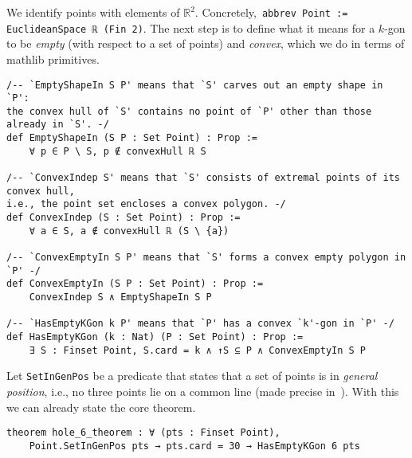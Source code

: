 We identify points with elements of $\mathbb{R}^2$. Concretely,~\lstinline|abbrev Point := EuclideanSpace ℝ (Fin 2)|.
The next step is to define what it means for a $k$-gon to be \emph{empty} (with respect to a set of points) and \emph{convex}, which we do in terms of \textsf{mathlib} primitives.

\begin{lstlisting}
/-- `EmptyShapeIn S P' means that `S' carves out an empty shape in `P':
the convex hull of `S' contains no point of `P' other than those already in `S'. -/
def EmptyShapeIn (S P : Set Point) : Prop :=
    ∀ p ∈ P \ S, p ∉ convexHull ℝ S

/-- `ConvexIndep S' means that `S' consists of extremal points of its convex hull,
i.e., the point set encloses a convex polygon. -/
def ConvexIndep (S : Set Point) : Prop :=
    ∀ a ∈ S, a ∉ convexHull ℝ (S \ {a})

/-- `ConvexEmptyIn S P' means that `S' forms a convex empty polygon in `P' -/
def ConvexEmptyIn (S P : Set Point) : Prop :=
    ConvexIndep S ∧ EmptyShapeIn S P

/-- `HasEmptyKGon k P' means that `P' has a convex `k'-gon in `P' -/
def HasEmptyKGon (k : Nat) (P : Set Point) : Prop :=
    ∃ S : Finset Point, S.card = k ∧ ↑S ⊆ P ∧ ConvexEmptyIn S P
\end{lstlisting}

Let \lstinline|SetInGenPos| be a predicate that states that a set of points is in \emph{general position}, i.e., no three points lie on a common line (made precise in~).
With this we can already state the core theorem.

\begin{lstlisting}
theorem hole_6_theorem : ∀ (pts : Finset Point),
    Point.SetInGenPos pts → pts.card = 30 → HasEmptyKGon 6 pts
\end{lstlisting}

